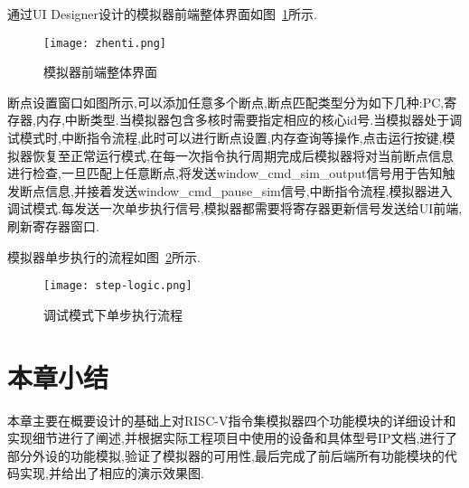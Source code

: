         
通过UI Designer设计的模拟器前端整体界面如图~\ref{fig:zhenti}所示.
\begin{figure}[h]
    \centering
    \texttt{[image: zhenti.png]}
    \caption{模拟器前端整体界面}
    \label{fig:zhenti}
\end{figure}


断点设置窗口如图所示,可以添加任意多个断点,断点匹配类型分为如下几种:PC,寄存器,内存,中断类型.当模拟器包含多核时需要指定相应的核心id号.当模拟器处于调试模式时,中断指令流程,此时可以进行断点设置,内存查询等操作,点击运行按键,模拟器恢复至正常运行模式,在每一次指令执行周期完成后模拟器将对当前断点信息进行检查,一旦匹配上任意断点,将发送window\_cmd\_sim\_output信号用于告知触发断点信息,并接着发送window\_cmd\_pause\_sim信号,中断指令流程,模拟器进入调试模式.每发送一次单步执行信号,模拟器都需要将寄存器更新信号发送给UI前端,刷新寄存器窗口.


模拟器单步执行的流程如图~\ref{fig:step}所示.
\begin{figure}[H]
    \centering
    \texttt{[image: step-logic.png]}
    \caption{调试模式下单步执行流程}
    \label{fig:step}
\end{figure}


\section{本章小结}
本章主要在概要设计的基础上对RISC-V指令集模拟器四个功能模块的详细设计和实现细节进行了阐述,并根据实际工程项目中使用的设备和具体型号IP文档,进行了部分外设的功能模拟,验证了模拟器的可用性,最后完成了前后端所有功能模块的代码实现,并给出了相应的演示效果图.


